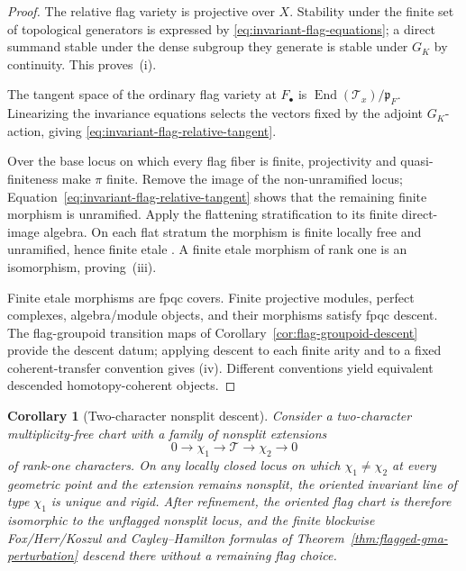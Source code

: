 \documentclass[11pt]{article}
\newtheorem{corollary}[theorem]{Corollary}
\theoremstyle{definition}
\begin{document}
\begin{proof}
The relative flag variety is projective over $X$.  Stability under the finite
set of topological generators is expressed by
\eqref{eq:invariant-flag-equations}; a direct summand stable under the dense
subgroup they generate is stable under $G_K$ by continuity.  This proves~(i).

The tangent space of the ordinary flag variety at $F_\bullet$ is
$\operatorname{End}(\mathcal T_x)/\mathfrak p_F$.  Linearizing the invariance
equations selects the vectors fixed by the adjoint $G_K$-action, giving
\eqref{eq:invariant-flag-relative-tangent}.

Over the base locus on which every flag fiber is finite, projectivity and
quasi-finiteness make $\pi$ finite.  Remove the image of the non-unramified
locus; Equation~\eqref{eq:invariant-flag-relative-tangent} shows that the
remaining finite morphism is unramified.  Apply the flattening stratification
to its finite direct-image algebra.  On each flat stratum the morphism is
finite locally free and unramified, hence finite etale
\cite{StacksFitting,StacksEtale}.  A finite etale morphism of rank one is an
isomorphism, proving~(iii).

Finite etale morphisms are fpqc covers.  Finite projective modules, perfect
complexes, algebra/module objects, and their morphisms satisfy fpqc descent.
The flag-groupoid transition maps of
Corollary~\ref{cor:flag-groupoid-descent} provide the descent datum; applying
descent to each finite arity and to a fixed coherent-transfer convention gives
(iv).  Different conventions yield equivalent descended homotopy-coherent
objects.
\end{proof}

\begin{corollary}[Two-character nonsplit descent]\label{cor:two-character-rigid-flag}
Consider a two-character multiplicity-free chart with a family of nonsplit
extensions
\[
 0\longrightarrow\chi_1\longrightarrow\mathcal T
 \longrightarrow\chi_2\longrightarrow0
\]
of rank-one characters.  On any locally closed locus on which
$\chi_1\ne\chi_2$ at every geometric point and the extension remains
nonsplit, the oriented invariant line of type $\chi_1$ is unique and rigid.
After refinement, the oriented flag chart is therefore isomorphic to the
unflagged nonsplit locus, and the finite blockwise Fox/Herr/Koszul and
Cayley--Hamilton formulas of Theorem~\ref{thm:flagged-gma-perturbation}
descend there without a remaining flag choice.
\end{corollary}
\end{document}
